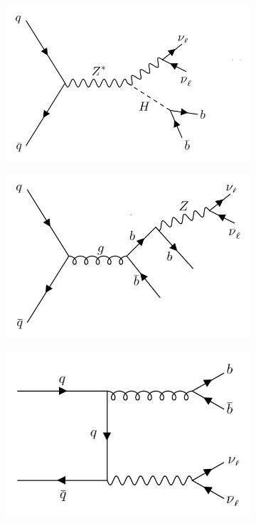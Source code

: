 \documentclass[10pt,a4paper]{book}
\begin{document}
\begin{figure}
\begin{subfigure}{.5\textwidth}
\centering
\includegraphics[width=\textwidth]{ch4_images/zhbb}
\caption{}
\end{subfigure}
\begin{subfigure}{.5\textwidth}
\centering
\includegraphics[width=\textwidth]{ch4_images/gbb1}
\caption{}\end{subfigure}
\begin{subfigure}{.5\textwidth}
\centering
\includegraphics[width=\textwidth]{ch4_images/gbb2}

\end{subfigure}
\end{figure}
\end{document}
